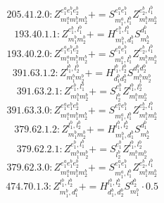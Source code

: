 \documentclass[letterpaper,10pt,fleqn,leqno,onecolumn]{article}
\begin{document}
\begin{equation} \;\;\;\;\;\;  205.41.2.0: Z^{e_{1}^{a}e_{1}^{b}e_{2}^{b}}_{m_{1}^{a}m_{1}^{b}m_{2}^{b}}+=S^{e_{1}^{a}e_{1}^{b}}_{m_{1}^{a},l_{1}^{b}}Z^{e_{2}^{b},l_{1}^{b}}_{m_{1}^{b}m_{2}^{b}} \end{equation}
\begin{equation} \;\;\;\;\;\;  193.40.1.1: Z^{e_{1}^{b},l_{1}^{b}}_{m_{1}^{b}m_{2}^{b}}+=H^{e_{1}^{b},l_{1}^{b}}_{m_{1}^{b},d_{1}^{b}}S^{d_{1}^{b}}_{m_{2}^{b}} \end{equation}
\begin{equation} \;\;\;\;\;\;  193.40.2.0: Z^{e_{1}^{a}e_{1}^{b}e_{2}^{b}}_{m_{1}^{a}m_{1}^{b}m_{2}^{b}}+=S^{e_{1}^{a}e_{1}^{b}}_{m_{1}^{a},l_{1}^{b}}Z^{e_{2}^{b},l_{1}^{b}}_{m_{1}^{b}m_{2}^{b}} \end{equation}
\begin{equation} \;\;\;\;\;\;  391.63.1.2: Z^{l_{1}^{b},l_{2}^{b}}_{m_{1}^{b}m_{2}^{b}}+=H^{l_{1}^{b},l_{2}^{b}}_{d_{1}^{b}d_{2}^{b}}S^{d_{1}^{b}d_{2}^{b}}_{m_{1}^{b}m_{2}^{b}} \end{equation}
\begin{equation} \;\;\;\;\;\;  391.63.2.1: Z^{e_{1}^{b},l_{1}^{b}}_{m_{1}^{b}m_{2}^{b}}+=S^{e_{1}^{b}}_{l_{2}^{b}}Z^{l_{1}^{b},l_{2}^{b}}_{m_{1}^{b}m_{2}^{b}} \end{equation}
\begin{equation} \;\;\;\;\;\;  391.63.3.0: Z^{e_{1}^{a}e_{1}^{b}e_{2}^{b}}_{m_{1}^{a}m_{1}^{b}m_{2}^{b}}+=S^{e_{1}^{a}e_{1}^{b}}_{m_{1}^{a},l_{1}^{b}}Z^{e_{2}^{b},l_{1}^{b}}_{m_{1}^{b}m_{2}^{b}} \end{equation}
\begin{equation} \;\;\;\;\;\;  379.62.1.2: Z^{l_{1}^{b},l_{2}^{b}}_{m_{1}^{b}m_{2}^{b}}+=H^{l_{1}^{b},l_{2}^{b}}_{m_{1}^{b},d_{1}^{b}}S^{d_{1}^{b}}_{m_{2}^{b}} \end{equation}
\begin{equation} \;\;\;\;\;\;  379.62.2.1: Z^{e_{1}^{b},l_{1}^{b}}_{m_{1}^{b}m_{2}^{b}}+=S^{e_{1}^{b}}_{l_{2}^{b}}Z^{l_{1}^{b},l_{2}^{b}}_{m_{1}^{b}m_{2}^{b}} \end{equation}
\begin{equation} \;\;\;\;\;\;  379.62.3.0: Z^{e_{1}^{a}e_{1}^{b}e_{2}^{b}}_{m_{1}^{a}m_{1}^{b}m_{2}^{b}}+=S^{e_{1}^{a}e_{1}^{b}}_{m_{1}^{a},l_{1}^{b}}Z^{e_{2}^{b},l_{1}^{b}}_{m_{1}^{b}m_{2}^{b}} \end{equation}
\begin{equation} \;\;\;\;\;\;  474.70.1.3: Z^{l_{1}^{b},l_{2}^{b}}_{m_{1}^{b},d_{1}^{b}}+=H^{l_{1}^{b},l_{2}^{b}}_{d_{1}^{b},d_{2}^{b}}S^{d_{2}^{b}}_{m_{1}^{b}}\cdot 0.5 \end{equation}
\end{document}

